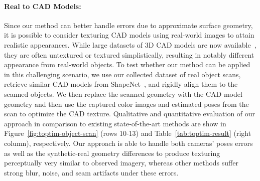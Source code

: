 \paragraph*{Real to CAD Models:}
Since our method can better handle errors due to approximate surface geometry, it is possible to consider texturing CAD models using real-world images to attain realistic appearances.   While large datasets of 3D CAD models are now available~\cite{chang2015shapenet}, they are often untextured or textured simplistically, resulting in notably different appearance from real-world objects. 
To test whether our method can be applied in this challenging scenario, 
we use our collected dataset of real object scans, retrieve similar CAD models from ShapeNet~\cite{chang2015shapenet}, and rigidly align them to the scanned objects.
We then replace the scanned geometry with the CAD model geometry and then use the captured color images and estimated poses from the scan to optimize the CAD texture.
Qualitative and quantitative evaluation of our approach in comparison to existing state-of-the-art methods are show in Figure~\ref{fig:toptim-object-scan} (rows 10-13) and Table~\ref{tab:toptim-result} (right column), respectively.
Our approach is able to handle both cameras' poses errors as well as the synthetic-real geometry differences to produce texturing perceptually very similar to observed imagery, whereas other methods suffer strong blur, noise, and seam artifacts under these errors.


